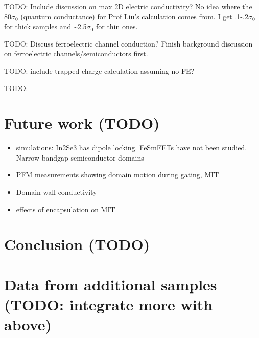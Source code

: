 TODO: Include discussion on max 2D electric conductivity? No idea
where the 80$\sigma_{0}$ (quantum conductance) for Prof Liu's calculation
comes from. I get .1-.2$\sigma_{0}$ for thick samples and \textasciitilde 2.5$\sigma_{0}$
for thin ones.

TODO: Discuss ferroelectric channel conduction? Finish background
discussion on ferroelectric channels/semiconductors first.

TODO: include trapped charge calculation assuming no FE?

TODO: \citep{hu2021firstprinciples}

\section{Future work (TODO)}
\begin{itemize}
\item simulations: In2Se3 has dipole locking. FeSmFETs have not been studied.
Narrow bandgap semiconductor domains
\item PFM measurements showing domain motion during gating, MIT
\item Domain wall conductivity
\item effects of encapsulation on MIT
\end{itemize}

\section{Conclusion (TODO)}

\section{Data from additional samples (TODO: integrate more with above)}

